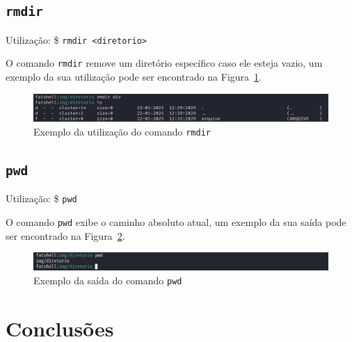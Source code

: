 \documentclass[
    12pt,				%
    oneside,   	        %
    a4paper,			%
    english,			%
    french,				%
    spanish,			%
    brazil,				%
    ]{pacotes/abntex2}
\begin{document}

\subsection{\texttt{rmdir}}
\label{subsec:rmdir}
Utilização: \$ \texttt{rmdir <diretorio>}

O comando \texttt{rmdir} remove um diretório específico caso ele esteja vazio, um exemplo da sua utilização pode ser encontrado na Figura~\ref{fig:rmdir}.

\begin{figure}[H]
    \centering
    \includegraphics[width=450pt]{figuras/resultados/17-rmdir.PNG}
    \caption{Exemplo da utilização do comando \texttt{rmdir}}
    \label{fig:rmdir}
\end{figure}


\subsection{\texttt{pwd}}
\label{subsec:pwd}
Utilização: \$ \texttt{pwd}

O comando \texttt{pwd} exibe o caminho absoluto atual, um exemplo da sua saída pode ser encontrado na Figura~\ref{fig:pwd}.

\begin{figure}[H]
    \centering
    \includegraphics[width=450pt]{figuras/resultados/19-pwd.PNG}
    \caption{Exemplo da saída do comando \texttt{pwd}}
    \label{fig:pwd}
\end{figure}


\section{Conclusões}
\label{sec:conclusoes}

\postextual
\renewcommand{\bibsection}{%
\section{\bibname}
\bibmark
\prebibhook}


\end{document}
